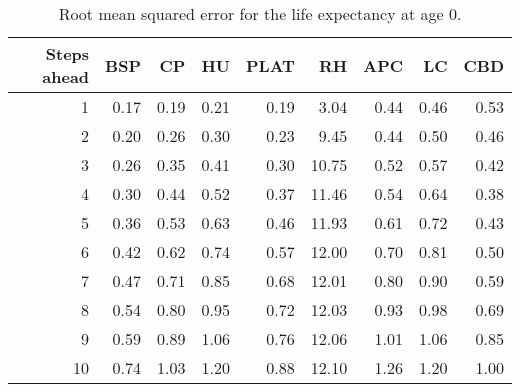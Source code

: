 % 
\begin{table}[ht]
\centering
\begin{tabular}{rrrrrrrrr}
  \hline
Steps ahead & BSP & CP & HU & PLAT & RH & APC & LC & CBD \\ 
  \hline
  1 & 0.17 & 0.19 & 0.21 & 0.19 & 3.04 & 0.44 & 0.46 & 0.53 \\ 
    2 & 0.20 & 0.26 & 0.30 & 0.23 & 9.45 & 0.44 & 0.50 & 0.46 \\ 
    3 & 0.26 & 0.35 & 0.41 & 0.30 & 10.75 & 0.52 & 0.57 & 0.42 \\ 
    4 & 0.30 & 0.44 & 0.52 & 0.37 & 11.46 & 0.54 & 0.64 & 0.38 \\ 
    5 & 0.36 & 0.53 & 0.63 & 0.46 & 11.93 & 0.61 & 0.72 & 0.43 \\ 
    6 & 0.42 & 0.62 & 0.74 & 0.57 & 12.00 & 0.70 & 0.81 & 0.50 \\ 
    7 & 0.47 & 0.71 & 0.85 & 0.68 & 12.01 & 0.80 & 0.90 & 0.59 \\ 
    8 & 0.54 & 0.80 & 0.95 & 0.72 & 12.03 & 0.93 & 0.98 & 0.69 \\ 
    9 & 0.59 & 0.89 & 1.06 & 0.76 & 12.06 & 1.01 & 1.06 & 0.85 \\ 
   10 & 0.74 & 1.03 & 1.20 & 0.88 & 12.10 & 1.26 & 1.20 & 1.00 \\ 
   \hline
\end{tabular}
\caption{Root mean squared error for the life expectancy at age 0.} 
\end{table}
